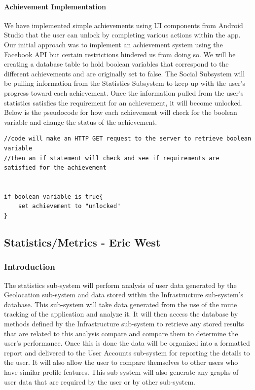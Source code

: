 ﻿\documentclass{article}
\begin{document}
\paragraph{Achievement Implementation}
We have implemented simple achievements using UI components from Android Studio that the user can unlock by completing various actions within the app.  Our initial approach was to implement an achievement system using the Facebook API but certain restrictions hindered us from doing so. We will be creating a database table to hold boolean variables that correspond to the different achievements and are originally set to false. The Social Subsystem will be pulling information from the Statistics Subsystem to keep up with the user's progress toward each achievement. Once the information pulled from the user's statistics satisfies the requirement for an achievement, it will become unlocked. Below is the pseudocode for how each achievement will check for the boolean variable and change the status of the achievement.

\begin{lstlisting}
//code will make an HTTP GET request to the server to retrieve boolean variable
//then an if statement will check and see if requirements are satisfied for the achievement


if boolean variable is true{
	set achievement to "unlocked"
}

\end{lstlisting}

\newpage

\subsection{Statistics/Metrics - Eric West}
\subsubsection{Introduction}
The statistics sub-system will perform analysis of user data generated by the Geolocation sub-system and data stored within the Infrastructure sub-system's database. This sub-system will take data generated from the use of the route tracking of the application and analyze it. It will then access the database by methods defined by the Infrastructure sub-system to retrieve any stored results that are related to this analysis compare and compare them to determine the user's performance. Once this is done the data will be organized into a formatted report and delivered to the User Accounts sub-system for reporting the details to the user. It will also allow the user to compare themselves to other users who have similar profile features. This sub-system will also generate any graphs of user data that are required by the user or by other sub-system.
\end{document}
